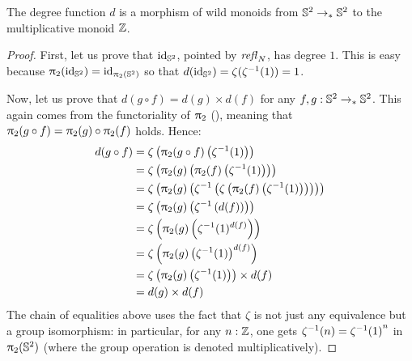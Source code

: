 \documentclass[english,a4]{article}
\newcommand{\ptdto}{\to_\ast}%
\begin{document}
\begin{proposition}
  The degree function $d$ is a morphism of wild monoids from $\Sp \ptdto \Sp$
  to the multiplicative monoid $\mathbb{Z}$.
  \label{prop:deg-monoid-morphism}
\end{proposition}
\begin{proof}
  First, let us prove that $\mathord{\mathrm{id}}_{{\mathbb S^{2}}}$, pointed by $\mathop{{\mathit{refl}}_{N}}$, has degree $1$.
  This is easy because $\uppi_{2}(\mathord{\mathrm{id}}_{{\mathbb S^{2}}}) = \mathord{\mathrm{id}}_{\uppi_{2}({{\mathbb S^{2}}})}$ so that $d(\mathord{\mathrm{id}}_{{\mathbb S^{2}}})
  = \zeta({\zeta}^{-1}(1)) = 1$.

  Now, let us prove that $d(g\circ f) = d(g)\times d(f)$ for any $f,g:\Sp
  \ptdto\Sp$. This again comes from the functoriality of $\uppi_{2}$
  (\cite[after Lem.\ 7.3.3 and before Def.\ 8.4.2]{HoTT}), 
  meaning that $\uppi_{2}(g\circ f) = \uppi_{2}(g)\circ\uppi_{2}(f)$
  holds. Hence:
  \begin{align*}
    d(g\circ f) &= \zeta\left( \uppi_{2}(g\circ f)\left( {\zeta}^{-1}(1) \right) \right) 
    \\
    &= \zeta\left( \uppi_{2}(g) \left( \uppi_{2}(f)\left( {\zeta}^{-1}(1) \right)
    \right) \right) 
    \\
    &= \zeta\left( \uppi_{2}(g) \left( {\zeta}^{-1} \left( \zeta \left( \uppi_{2}(f)\left( {\zeta}^{-1}(1) \right)
    \right) \right) \right) \right)
    \\
    &= \zeta \left( \uppi_{2}(g) \left( {\zeta}^{-1} \left(d(f)\right) \right) \right)
    \\
    &= \zeta \left( \uppi_{2}(g) \left( {\zeta}^{-1}(1)^{d(f)} \right) \right)
    \\
    &= \zeta \left( \uppi_{2}(g) \left( {\zeta}^{-1}(1)\right)^{d(f)} \right)
    \\
    &= \zeta \left( \uppi_{2}(g) \left( {\zeta}^{-1}(1)\right) \right)\times d(f)
    \\
    &= d(g)\times d(f)
  \end{align*}
  The chain of equalities above uses the fact that $\zeta$ is not just any
  equivalence but a group isomorphism: in particular, for any $n:\mathbb{Z}$, one
  gets ${\zeta}^{-1}(n) = {{\zeta}^{-1}(1)}^n$ in $\uppi_{2}({{\mathbb S^{2}}})$ (where the group
  operation is denoted multiplicatively).
\end{proof}
\end{document}
